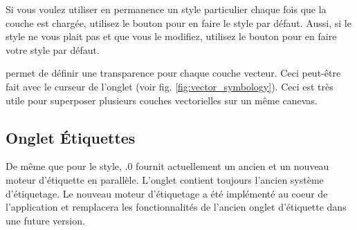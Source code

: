 Si vous voulez utiliser en permanence un style particulier chaque fois que la 
couche est chargée, utilisez le bouton  pour 
en faire le style par défaut. Aussi, si le style ne vous plait pas et que vous 
le modifiez, utilisez le bouton  pour en 
faire votre style par défaut.

 \label{sec:vect_transparency} 

\qg permet de définir une transparence pour chaque couche vecteur. Ceci peut-être 
fait avec le curseur  de l'onglet  
(voir fig. \ref{fig:vector_symbology}). Ceci est très utile pour superposer 
plusieurs couches vectorielles sur un même canevas.

\subsection{Onglet Étiquettes}

De même que pour le style, .0 fournit actuellement un ancien et un nouveau 
moteur d'étiquette en parallèle. L'onglet  contient toujours 
l'ancien système d'étiquetage. Le nouveau moteur d'étiquetage a été implémenté 
au coeur de l'application et remplacera les fonctionnalités de l'ancien onglet 
d'étiquette dans une future version.

